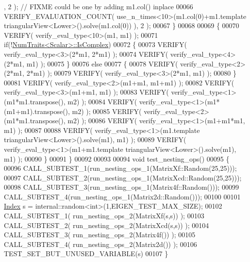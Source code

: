 \begin{DoxyCode}
      , 2 ); \textcolor{comment}{// FIXME could be one by adding m1.col() inplace}
00066     VERIFY\_EVALUATION\_COUNT( use\_n\_times<10>(m1.col(0)+m1.template triangularView<Lower>().solve(m1.col(0))
      ), 2 );
00067   \}
00068 
00069   \{
00070     VERIFY( verify\_eval\_type<10>(m1, m1) );
00071     \textcolor{keywordflow}{if}(!\hyperlink{group___core___module_struct_eigen_1_1_num_traits}{NumTraits<Scalar>::IsComplex})
00072     \{
00073       VERIFY( verify\_eval\_type<3>(2*m1, 2*m1) );
00074       VERIFY( verify\_eval\_type<4>(2*m1, m1) );
00075     \}
00076     \textcolor{keywordflow}{else}
00077     \{
00078       VERIFY( verify\_eval\_type<2>(2*m1, 2*m1) );
00079       VERIFY( verify\_eval\_type<3>(2*m1, m1) );
00080     \}
00081     VERIFY( verify\_eval\_type<2>(m1+m1, m1+m1) );
00082     VERIFY( verify\_eval\_type<3>(m1+m1, m1) );
00083     VERIFY( verify\_eval\_type<1>(m1*m1.transpose(), m2) );
00084     VERIFY( verify\_eval\_type<1>(m1*(m1+m1).transpose(), m2) );
00085     VERIFY( verify\_eval\_type<2>(m1*m1.transpose(), m2) );
00086     VERIFY( verify\_eval\_type<1>(m1+m1*m1, m1) );
00087 
00088     VERIFY( verify\_eval\_type<1>(m1.template triangularView<Lower>().solve(m1), m1) );
00089     VERIFY( verify\_eval\_type<1>(m1+m1.template triangularView<Lower>().solve(m1), m1) );
00090   \}
00091 \}
00092 
00093 
00094 \textcolor{keywordtype}{void} test\_nesting\_ops()
00095 \{
00096   CALL\_SUBTEST\_1(run\_nesting\_ops\_1(MatrixXf::Random(25,25)));
00097   CALL\_SUBTEST\_2(run\_nesting\_ops\_1(MatrixXcd::Random(25,25)));
00098   CALL\_SUBTEST\_3(run\_nesting\_ops\_1(Matrix4f::Random()));
00099   CALL\_SUBTEST\_4(run\_nesting\_ops\_1(Matrix2d::Random()));
00100 
00101   \hyperlink{namespace_eigen_a62e77e0933482dafde8fe197d9a2cfde}{Index} s = internal::random<int>(1,EIGEN\_TEST\_MAX\_SIZE);
00102   CALL\_SUBTEST\_1( run\_nesting\_ops\_2(MatrixXf(s,s)) );
00103   CALL\_SUBTEST\_2( run\_nesting\_ops\_2(MatrixXcd(s,s)) );
00104   CALL\_SUBTEST\_3( run\_nesting\_ops\_2(Matrix4f()) );
00105   CALL\_SUBTEST\_4( run\_nesting\_ops\_2(Matrix2d()) );
00106   TEST\_SET\_BUT\_UNUSED\_VARIABLE(s)
00107 \}
\end{DoxyCode}
